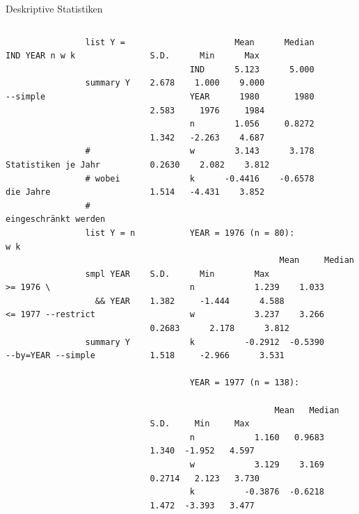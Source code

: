 \documentclass{beamer}[11pt]
\begin{document}
\begin{frame}[fragile]{Deskriptive Statistiken}
	\begin{columns}[T] %
		\scriptsize
		\begin{column}{.45\textwidth}
			\begin{verbatim}
				list Y = IND YEAR n w k

				summary Y --simple



				# Statistiken je Jahr
				# wobei die Jahre
				# eingeschränkt werden
				list Y = n w k

				smpl YEAR >= 1976 \
				  && YEAR <= 1977 --restrict

				summary Y --by=YEAR --simple
			\end{verbatim}
		\end{column}

		\begin{column}{.55\textwidth}
			\tiny
			\begin{verbatim}
		         Mean      Median     S.D.      Min      Max
		IND      5.123      5.000     2.678    1.000    9.000
		YEAR      1980       1980     2.583     1976     1984
		n        1.056     0.8272     1.342   -2.263    4.687
		w        3.143      3.178    0.2630    2.082    3.812
		k      -0.4416    -0.6578     1.514   -4.431    3.852


		YEAR = 1976 (n = 80):

			              Mean     Median     S.D.      Min        Max
		n            1.239    1.033    1.382     -1.444      4.588
		w            3.237    3.266   0.2683      2.178      3.812
		k          -0.2912  -0.5390    1.518     -2.966      3.531

		YEAR = 1977 (n = 138):

			             Mean   Median    S.D.     Min     Max
		n            1.160   0.9683   1.340  -1.952   4.597
		w            3.129    3.169  0.2714   2.123   3.730
		k          -0.3876  -0.6218   1.472  -3.393   3.477
			\end{verbatim}
	  \end{column}
	\end{columns}
\end{frame}
\end{document}
